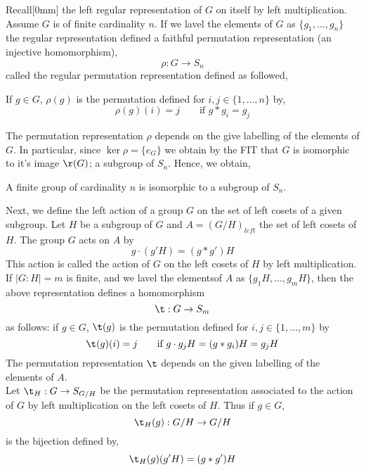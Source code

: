 
Recall[0mm] the left regular representation of $G$ on itself by left multiplication. Assume $G$ is of finite cardinality $n$. If we lavel the elements of $G$ as $\{g_1, \dots, g_n\}$ the regular representation defined a faithful permutation representation (an injective homomorphism),
$$ \rho : G \to S_n $$
called the regular permutation representation defined as followed,
\begin{ndefi}
  If $g \in G$, $\rho(g)$ is the permutation defined for $i,j \in \{1, \dots, n\}$ by,
  $$ \rho(g)(i) = j \qquad \text{if $g * g_i = g_j$} $$
\end{ndefi}
The permutation representation $\rho$ depends on the give labelling of the elements of $G$. In particular, since $\ker \rho = \{e_G\}$ we obtain by the FIT that $G$ is isomorphic to it's image $\r(G)$; a subgroup of $S_n$. Hence, we obtain,
\begin{nthm}
  A finite group of cardinality $n$ is isomorphic to a subgroup of $S_n$.
\end{nthm}
Next, we define the left action of a group $G$ on the set of left cosets of a given subgroup. Let $H$ be a subgroup of $G$ and $A = (G/H)_{left}$ the set of left cosets of $H$. The group $G$ acts on $A$ by
$$ g \cdot (g'H) = (g * g')H $$
This action is called the action of $G$ on the left cosets of $H$ by left multiplication. If $|G : H| = m$ is finite, and we lavel the elementsof $A$ as $\{g_1H, \dots, g_mH\}$, then the above representation defines a homomorphism
$$ \t : G \to S_m $$
as follows: if $g \in G$, $\t(g)$ is the permutation defined for $i,j \in \{1, \dots, m\}$ by
$$ \t(g)(i) = j \qquad \text{if $g \cdot g_jH = (g*g_i)H = g_jH$}$$
The permutation representation $\t$ depends on the given labelling of the elements of $A$.\\

\noindent
Let $\t_H : G\to S_{G/H}$ be the permutation representation associated to the action of $G$ by left multiplication on the left cosets of $H$. Thus if $g \in G$,
$$ \t_H(g) : G/H \to G/H $$
is the bijection defined by,
$$ \t_H(g)(g'H) = (g*g')H $$

